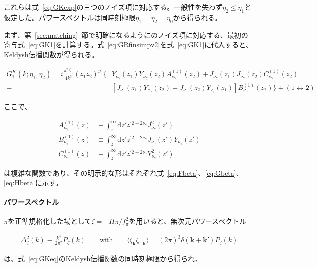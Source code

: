 \documentclass[a4paper,11pt]{ltjsarticle}
\numberwithin{equation}{section}
\newcommand{\dd}{\mathrm{d}}
\newcommand{\boldmathsymbol}[1]{{\ensuremath{\boldsymbol{#1}}}}
\newcommand{\bmk}{\boldmathsymbol{k}}
\newcommand{\Eq}[1]{Eq.~(\ref{#1})}
\newcommand{\Eqs}[1]{Eqs.~(\ref{#1})}
\newcommand{\Sec}[1]{Sec.~\ref{#1}}
\def\bmk{{\boldsymbol{k}}}
\renewcommand{\Eq}[1]{式~\eqref{#1}}
\renewcommand{\Eqs}[1]{式~\eqref{#1}}
\renewcommand{\Sec}[1]{第~\ref{#1}~節}
\begin{document}
これらは\Eq{eq:GKexp}の三つのノイズ項に対応する。一般性を失わず$\eta_2\leq\eta_1$と仮定した。パワースペクトルは同時刻極限$\eta_1=\eta_2=\eta_0$から得られる。

まず、\Sec{sec:matching}で明確になるように\cite{LopezNacir:2011kk,Creminelli:2023aly}のノイズ項に対応する、最初の寄与\Eq{eq:GK1}を計算する。\Eq{eq:GRfinsimpv2}を\Eq{eq:GK1}に代入すると、Keldysh伝播関数が得られる。

\begin{align}\label{eq:GKeq}
    G^K_1(k;\eta_1,\eta_2) = i\frac{\pi^2 \beta_1}{4 k^3}  (z_1 z_2)^{\nu_\gamma} \bigg\{& Y_{\nu_\gamma}(z_1) Y_{\nu_\gamma}(z_2) A^{(1)}_{\nu_\gamma}(z_2) + J_{\nu_\gamma}(z_1) J_{\nu_\gamma}(z_2) C^{(1)}_{\nu_\gamma}(z_2) \\
    -& \left[J_{\nu_\gamma}(z_1)Y_{\nu_\gamma}(z_2) + J_{\nu_\gamma}(z_2)Y_{\nu_\gamma}(z_1)\right]B^{(1)}_{\nu_\gamma}(z_2) \bigg\} + (1 \leftrightarrow 2)\nonumber
\end{align}

ここで、

\begin{align}
        A^{(1)}_{\nu_\gamma}(z) &\equiv \int_{z}^{\infty} \dd z' z^{\prime2 - 2{\nu_\gamma}} J^2_{\nu_\gamma}(z')  \label{eq:Fbetaref}\\
        B^{(1)}_{\nu_\gamma}(z) &\equiv \int_{z}^{\infty} \dd z' z^{\prime2 - 2{\nu_\gamma}} J_{\nu_\gamma}(z') Y_{\nu_\gamma}(z') \label{eq:Gbetaref} \\
        C^{(1)}_{\nu_\gamma}(z)&\equiv \int_{z}^{\infty} \dd z' z^{\prime2 - 2{\nu_\gamma}} Y^2_{\nu_\gamma}(z') \label{eq:Hbetaref}
\end{align}

は複雑な関数であり、その明示的な形はそれぞれ\Eqs{eq:Fbeta}、\eqref{eq:Gbeta}、\eqref{eq:Hbeta}に示す。

\paragraph{パワースペクトル} $\pi$を正準規格化した場として$\zeta=-H\pi/f_\pi^2$を用いると、無次元パワースペクトル

\begin{align}
\Delta^2_\zeta(k) \equiv \frac{k^3}{2\pi^2}P_\zeta(k) \qquad \mathrm{with} \qquad \langle \zeta_\bmk \zeta_{-\bmk}\rangle = (2\pi)^3 \delta(\bmk + \bmk') P_\zeta(k)
\end{align}

は、\Eq{eq:GKeq}のKeldysh伝播関数の同時刻極限から得られ、
\end{document}
